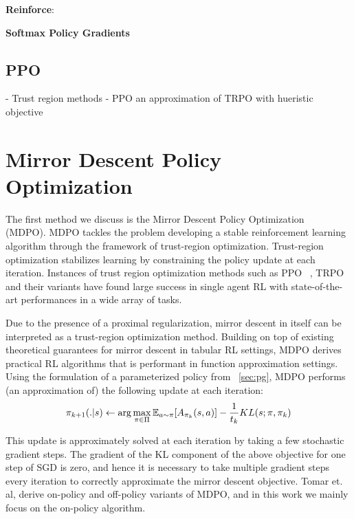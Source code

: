 \textbf{Reinforce}:

\textbf{Softmax Policy Gradients}

\subsection{PPO}

- Trust region methods
- PPO an approximation of TRPO with hueristic objective

\section[MDPO]{Mirror Descent Policy Optimization}

The first method we discuss is the Mirror Descent Policy Optimization~ \cite{tomarMirror2022}
(MDPO).
MDPO tackles the problem developing a stable reinforcement learning algorithm through the framework
of trust-region optimization.
Trust-region optimization stabilizes learning by constraining the policy update at each iteration.
Instances of trust region optimization methods such as PPO~ \cite{schulmanProximal2017}, TRPO~
\cite{schulmanTrust2015} and their variants have found large success in single agent RL with
state-of-the-art performances in a wide array of tasks.

Due to the presence of a \textbf{}proximal regularization, mirror descent in itself can be interpreted as a
trust-region optimization method.
Building on top of existing theoretical guarantees for mirror descent in tabular RL settings, MDPO
derives practical RL algorithms that is performant in function approximation settings.
Using the formulation of a parameterized policy from~ \ref{sec:pg}, MDPO performs (an approximation of) the following
update at each iteration:
\begin{equation}
	\label{eqn:mdrl} \pi_{k+1}(.
	|s) \leftarrow \arg
	\max_{\pi \in \Pi}
	\mathbb{E}_{a \sim \pi} [A_{\pi_k}(s,a)] -
	\frac{1}{t_k}
	KL(s; \pi, \pi_k)
\end{equation}

This update is approximately solved at each
iteration by taking a few stochastic gradient steps.
The gradient of the KL component of the above objective for one step of SGD is zero, and hence it
is necessary to take multiple gradient steps every iteration to correctly approximate the mirror
descent objective.
Tomar et. al, derive on-policy and off-policy variants of MDPO, and in this work we mainly focus on
the on-policy algorithm.

